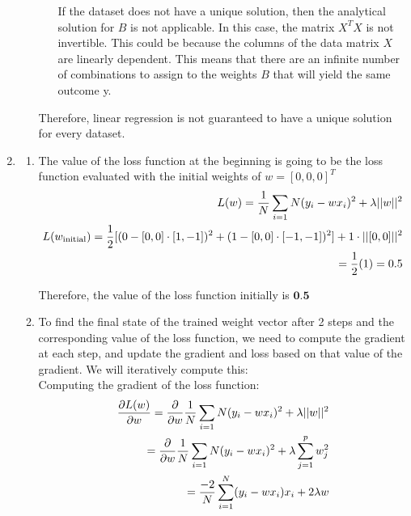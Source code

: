 \documentclass[12pt]{article}
\begin{document}
\begin{enumerate}
\begin{enumerate}
\begin{enumerate}
  If the dataset does not have a unique solution, then the analytical solution for $B$ is not applicable. In this case, the matrix $X^TX$ is not invertible. This could be because the columns of the data matrix $X$ are linearly dependent. This means that there are an infinite number of combinations to assign to the weights $B$ that will yield the same outcome y.
 \end{enumerate}

 Therefore, linear regression is not guaranteed to have a unique solution for every dataset.

  \end{enumerate}

\item
  \begin{enumerate}
  \item The value of the loss function at the beginning is going to be the loss function evaluated with the initial weights of $w = [0,0,0]^T$ \\ 
  \begin{align}
    L(w) = \frac{1}{N} \sum_{i = 1}{N} (y_i - wx_i)^2 + \lambda ||w||^2 \notag \\
    L(w_{\text{initial}}) = \frac{1}{2} [ (0 - [0,0] \cdot [1,-1])^2 + (1 - [0,0] \cdot [-1,-1])^2] + 1 \cdot ||[0,0]||^2 \notag \\ 
    = \frac{1}{2} (1) = 0.5 \notag
  \end{align}
  
  Therefore, the value of the loss function initially is $\textbf{0.5}$

  \item To find the final state of the trained weight vector after 2 steps and the corresponding value of the loss function, we need to compute the gradient at each
  step, and update the gradient and loss based on that value of the gradient. We will iteratively compute this: \\ 

  Computing the gradient of the loss function: \\  
  \begin{align}
    \frac{\partial L(w)}{\partial w} = \frac{\partial}{\partial w} \frac{1}{N} \sum_{i = 1}{N} (y_i - wx_i)^2 + \lambda ||w||^2 \notag \\ 
    = \frac{\partial}{\partial w} \frac{1}{N} \sum_{i = 1}{N} (y_i - wx_i)^2 + \lambda \sum_{j=1}^{p}w_j^2 \notag \\ 
    = \frac{-2}{N} \sum_{i=1}^{N} (y_i - wx_i)x_i + 2 \lambda w \notag 
   \end{align}


\end{enumerate}
\end{enumerate}
\end{document}
